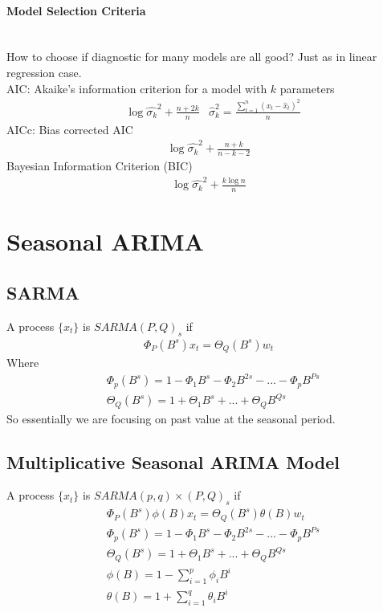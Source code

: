 \paragraph{Model Selection Criteria} \mbox{}\\
How to choose if diagnostic for many models are all good? Just as in linear regression case. \\

AIC: Akaike's information criterion for a model with $k$ parameters
    \begin{align*}
        & \log \hat{\sigma_k}^2 + \frac{n + 2k}{n} & \hat{\sigma}_k^2 = \frac{\sum_{t=1}^n (x_t - \hat{x}_t)^2}{n}
    \end{align*}
AICc: Bias corrected AIC
    \begin{align*}
        \log \hat{\sigma_k}^2 + \frac{n+k}{n-k-2}
    \end{align*}
Bayesian Information Criterion (BIC)
    \begin{align*}
        \log \hat{\sigma_k}^2 + \frac{k \log n}{n}
    \end{align*}
    
\section{Seasonal ARIMA}
\subsection{SARMA}
A process $\{ x_t \}$ is $SARMA(P,Q)_s$ if 
    \begin{align*}
        \Phi_P(B^s) x_t = \Theta_Q(B^s) w_t 
    \end{align*}
Where
    \begin{align*}
        & \Phi_p (B^s) = 1 - \Phi_1 B^s - \Phi_2 B^{2s} - ... - \Phi_p B^{Ps}\\
        & \Theta_Q(B^s) = 1 + \Theta_1 B^s + ... + \Theta_Q B^{Qs}
    \end{align*}
So essentially we are focusing on past value at the seasonal period. 

\subsection{Multiplicative Seasonal ARIMA Model}
A process $\{ x_t \}$ is $SARMA(p,q) \times (P,Q)_s$ if 
    \begin{align*}
        & \Phi_P(B^s) \phi(B) x_t = \Theta_Q(B^s) \theta(B) w_t\\
        & \Phi_p (B^s) = 1 - \Phi_1 B^s - \Phi_2 B^{2s} - ... - \Phi_p B^{Ps}\\
        & \Theta_Q(B^s) = 1 + \Theta_1 B^s + ... + \Theta_Q B^{Qs}\\
        & \phi(B) = 1 - \sum_{i=1}^p \phi_i B^i \\
        & \theta(B) = 1 + \sum_{i=1}^q \theta_i B^i
    \end{align*}
    
